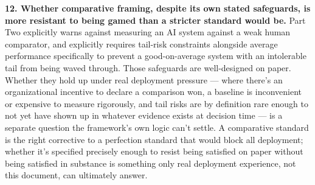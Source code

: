 \textbf{12. Whether comparative framing, despite its own stated safeguards, is more resistant to being gamed than a stricter standard would be.} Part Two explicitly warns against measuring an AI system against a weak human comparator, and explicitly requires tail-risk constraints alongside average performance specifically to prevent a good-on-average system with an intolerable tail from being waved through. Those safeguards are well-designed on paper. Whether they hold up under real deployment pressure --- where there's an organizational incentive to declare a comparison won, a baseline is inconvenient or expensive to measure rigorously, and tail risks are by definition rare enough to not yet have shown up in whatever evidence exists at decision time --- is a separate question the framework's own logic can't settle. A comparative standard is the right corrective to a perfection standard that would block all deployment; whether it's specified precisely enough to resist being satisfied on paper without being satisfied in substance is something only real deployment experience, not this document, can ultimately answer.
